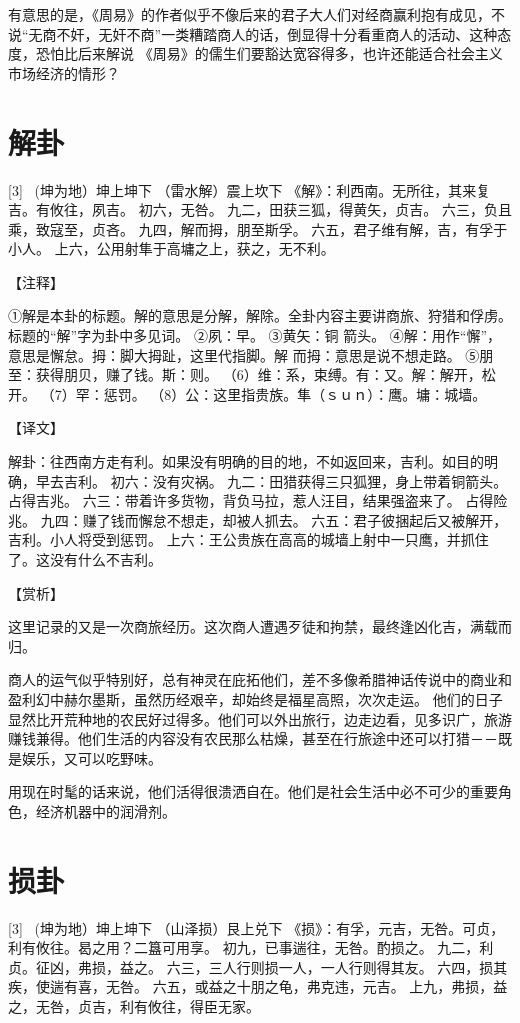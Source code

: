 \documentclass[12pt,UTF8]{ctexbook}
\begin{document}
有意思的是，《周易》的作者似乎不像后来的君子大人们对经商赢利抱有成见，不说“无商不奸，无奸不商”一类糟踏商人的话，倒显得十分看重商人的活动、这种态度，恐怕比后来解说 《周易》的儒生们要豁达宽容得多，也许还能适合社会主义市场经济的情形？

\chapter{解卦}
[3] \ (坤为地）坤上坤下
（雷水解）震上坎下
《解》：利西南。无所往，其来复吉。有攸往，夙吉。
初六，无咎。
九二，田获三狐，得黄矢，贞吉。
六三，负且乘，致寇至，贞吝。
九四，解而拇，朋至斯孚。
六五，君子维有解，吉，有孚于小人。
上六，公用射隼于高墉之上，获之，无不利。

【注释】

①解是本卦的标题。解的意思是分解，解除。全卦内容主要讲商旅、狩猎和俘虏。标题的“解”字为卦中多见词。
②夙：早。
③黄矢：铜 箭头。
④解：用作“懈”，意思是懈怠。拇：脚大拇趾，这里代指脚。解 而拇：意思是说不想走路。
⑤朋至：获得朋贝，赚了钱。斯：则。
（6）维：系，束缚。有：又。解：解开，松开。
（7）罕：惩罚。
（8）公：这里指贵族。隼（ｓｕｎ）：鹰。墉：城墙。

【译文】

解卦：往西南方走有利。如果没有明确的目的地，不如返回来，吉利。如目的明确，早去吉利。
初六：没有灾祸。
九二：田猎获得三只狐狸，身上带着铜箭头。占得吉兆。
六三：带着许多货物，背负马拉，惹人汪目，结果强盗来了。 占得险兆。
九四：赚了钱而懈怠不想走，却被人抓去。
六五：君子彼捆起后又被解开，吉利。小人将受到惩罚。
上六：王公贵族在高高的城墙上射中一只鹰，并抓住了。这没有什么不吉利。

【赏析】

这里记录的又是一次商旅经历。这次商人遭遇歹徒和拘禁，最终逢凶化吉，满载而归。

商人的运气似乎特别好，总有神灵在庇拓他们，差不多像希腊神话传说中的商业和盈利幻中赫尔墨斯，虽然历经艰辛，却始终是福星高照，次次走运。 他们的日子显然比开荒种地的农民好过得多。他们可以外出旅行，边走边看，见多识广，旅游赚钱兼得。他们生活的内容没有农民那么枯燥，甚至在行旅途中还可以打猎－－既是娱乐，又可以吃野味。

用现在时髦的话来说，他们活得很溃洒自在。他们是社会生活中必不可少的重要角色，经济机器中的润滑剂。

\chapter{损卦}
[3] \ (坤为地）坤上坤下
（山泽损）艮上兑下
《损》：有孚，元吉，无咎。可贞，利有攸往。曷之用？二簋可用享。
初九，已事遄往，无咎。酌损之。
九二，利贞。征凶，弗损，益之。
六三，三人行则损一人，一人行则得其友。
六四，损其疾，使遄有喜，无咎。
六五，或益之十朋之龟，弗克违，元吉。
上九，弗损，益之，无咎，贞吉，利有攸往，得臣无家。
\end{document}
